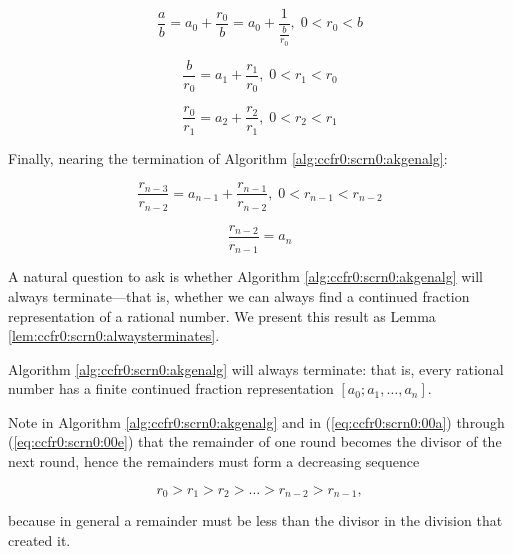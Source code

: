 \begin{equation}
\label{eq:ccfr0:scrn0:00a}
\frac{a}{b}
=
a_0 + \frac{r_0}{b}
=
a_0 + \frac{1}{\frac{b}{r_0}} 
, \; 0 < r_0 < b
\end{equation}

\begin{equation}
\label{eq:ccfr0:scrn0:00b}
\frac{b}{r_0}
=
a_1 + \frac{r_1}{r_0}
, \; 0 < r_1 < r_0
\end{equation}

\begin{equation}
\label{eq:ccfr0:scrn0:00c}
\frac{r_0}{r_1}
=
a_2 + \frac{r_2}{r_1}
, \; 0 < r_2 < r_1
\end{equation}

\noindent{}Finally, nearing the termination of 
Algorithm \ref{alg:ccfr0:scrn0:akgenalg}:

\begin{equation}
\label{eq:ccfr0:scrn0:00d}
\frac{r_{n-3}}{r_{n-2}}
=
a_{n-1} + \frac{r_{n-1}}{r_{n-2}}
, \; 0 < r_{n-1} < r_{n-2}
\end{equation}

\begin{equation}
\label{eq:ccfr0:scrn0:00e}
\frac{r_{n-2}}{r_{n-1}}
=
a_n
\end{equation}

A natural question to ask is whether Algorithm \ref{alg:ccfr0:scrn0:akgenalg}
will always terminate---that is, whether we can always find a continued
fraction representation of a rational number.  We present this result
as Lemma \ref{lem:ccfr0:scrn0:alwaysterminates}.

\begin{vworklemmastatement}
\label{lem:ccfr0:scrn0:alwaysterminates}
Algorithm \ref{alg:ccfr0:scrn0:akgenalg} will always terminate:  that is,
every rational number has a finite continued fraction representation
$[a_0; a_1, \ldots{} , a_n]$.
\end{vworklemmastatement}
\begin{vworklemmaproof}
Note in Algorithm \ref{alg:ccfr0:scrn0:akgenalg} and in
(\ref{eq:ccfr0:scrn0:00a}) through (\ref{eq:ccfr0:scrn0:00e})
that the remainder of one round becomes the divisor of the
next round, hence the remainders must form a decreasing sequence

\begin{equation}
\label{eq:lem:ccfr0:scrn0:alwaysterminates}
r_0 > r_1 > r_2 > \ldots{} > r_{n-2} > r_{n-1} ,
\end{equation}

because in general a remainder must be less than the divisor in
the division that created it.
\end{vworklemmaproof}
\vworklemmafooter{}


